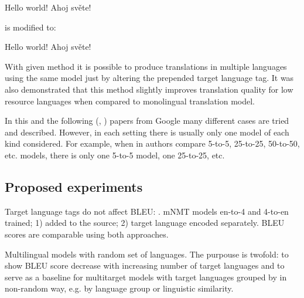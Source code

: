 \begin{displayquote}
Hello world! \to{} Ahoj světe!
\end{displayquote}
is modified to:

\begin{displayquote}
 Hello world! \to{} Ahoj světe!
\end{displayquote}

With given method it is possible to produce translations in multiple languages using the
same model just by altering the prepended target language tag.
It was also demonstrated that this method slightly improves translation quality for 
low resource languages when compared to monolingual translation model.

In this and the following
(, )
papers from Google many different cases are tried and described.
However, in each setting there is usually only one model of each kind considered.
For example, when in  authors compare 5-to-5,
25-to-25, 50-to-50, etc. models, there is only one 5-to-5 model, one 25-to-25, etc.


\subsection{Proposed experiments}
\label{subsection:proposed_experiments}



Target language tags do not affect BLEU: .
mNMT models en-to-4 and 4-to-en trained;
 1)  added to the source;
 2) target language encoded separately.
BLEU scores are comparable using both approaches.


Multilingual models with random set of languages.
The purpouse is twofold: 
to show BLEU score decrease with increasing number of target languages and
to serve as a baseline for multitarget models with target languages grouped by
in non-random way, e.g. by language group or linguistic similarity.


